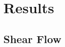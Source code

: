 \documentclass[preprint, 10pt]{elsarticle}
\begin{document}

\section{Results\label{s:results}} 

\subsection{Shear Flow}
\end{document}
